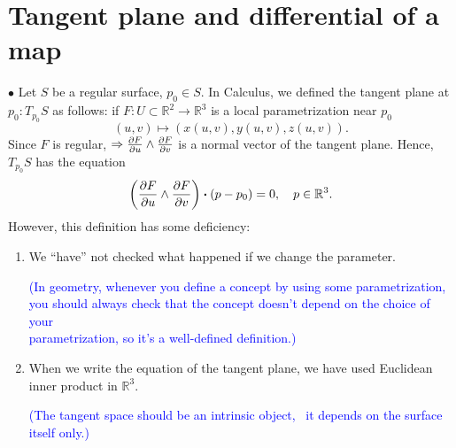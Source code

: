 \section{Tangent plane and differential of a map}
$\bullet$ Let $S$ be a regular surface, \(p_0\in S\). In Calculus, we
defined the tangent plane at \(p_0\colon T_{p_0}S\) as follows: if
\(F\colon U\subset \mathbb{R}^2\to \mathbb{R}^3\) is a local parametrization near \(p_0\)
\[
    (u,v)\mapsto \left(x(u,v),y(u,v),z(u,v)\right).
\]
Since \(F\) is regular, \(\Rightarrow \pdv{F}{u}\wedge\pdv
{F}{v}\) is a normal vector of the tangent plane. Hence,
\(T_{p_0}S\) has the equation
\[
    \left(\pdv{F}{u}\wedge\pdv{F}{v}\right)\vdot
    (p-p_0)=0,\quad p\in \mathbb{R}^3  .
\]
However, this definition has some deficiency:
\begin{enumerate}[(1)]
    \item We ``have'' not checked what happened if we change the parameter.

    \textcolor{blue}{(In geometry, whenever you define a concept by using
          some parametrization, \\ you should always check that the concept doesn't
          depend on the choice of your \\ parametrization, so it's a well-defined
          definition.)}
    \item When we write the equation of the tangent plane, we have used
      Euclidean inner product in $\mathbb{R}^3$.

      \textcolor{blue}{(The tangent space should be an intrinsic object, \ie\ it depends on the surface itself only.)}
\end{enumerate}
